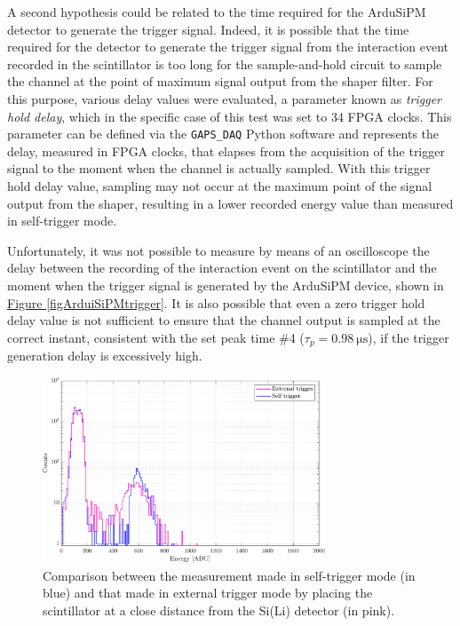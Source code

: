 \par
A second hypothesis could be related to the time required for the ArduSiPM detector to generate the trigger signal. Indeed, it is possible that the time required for the detector to generate the trigger signal from the interaction event recorded in the scintillator is too long for the sample-and-hold circuit to sample the channel at the point of maximum signal output from the shaper filter. For this purpose, various delay values were evaluated, a parameter known as \textit{trigger hold delay}, which in the specific case of this test was set to 34 FPGA clocks. This parameter can be defined via the \texttt{GAPS\_DAQ} Python software and represents the delay, measured in FPGA clocks, that elapses from the acquisition of the trigger signal to the moment when the channel is actually sampled. With this trigger hold delay value, sampling may not occur at the maximum point of the signal output from the shaper, resulting in a lower recorded energy value than measured in self-trigger mode. 

\par
Unfortunately, it was not possible to measure by means of an oscilloscope the delay between the recording of the interaction event on the scintillator and the moment when the trigger signal is generated by the ArduSiPM device, shown in \hyperref[figArduiSiPMtrigger]{Figure \ref{figArduiSiPMtrigger}}. It is also possible that even a zero trigger hold delay value is not sufficient to ensure that the channel output is sampled at the correct instant, consistent with the set peak time \#4 ($\tau_{p} = \SI{0.98}{\micro\second}$), if the trigger generation delay is excessively high.

\begin{figure}[h!]
    \centering
    \includegraphics[width=0.75\textwidth]{Images/chap3/results/muons/ext_self_muons_THR_130_delay_34_ch0-7.pdf}
    \caption{Comparison between the measurement made in self-trigger mode (in blue) and that made in external trigger mode by placing the scintillator at a close distance from the Si(Li) detector (in pink).}
    \label{figMUONselfExtComparativaCH0-7}
\end{figure}

